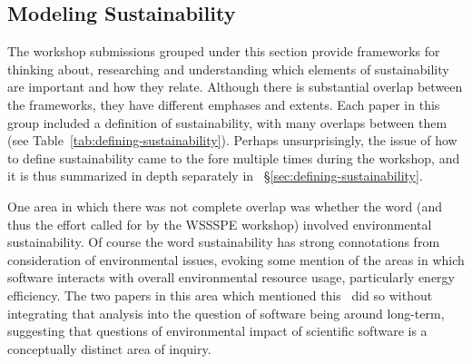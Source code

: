 \documentclass[11pt, oneside]{amsart}
\begin{document}
\subsection{Modeling Sustainability}

The workshop submissions grouped under this section provide frameworks
for thinking about, researching and understanding which elements of
sustainability are important and how they relate. Although there is
substantial overlap between the frameworks, they have different
emphases and extents.  Each paper in this group included a definition
of sustainability, with many overlaps between them (see
Table~\ref{tab:defining-sustainability}).  Perhaps unsurprisingly, the
issue of how to define sustainability came to the fore multiple times
during the workshop, and it is thus summarized in depth separately in
~\S\ref{sec:defining-sustainability}.

One area in which there was not complete overlap was whether the word
(and thus the effort called for by the WSSSPE workshop) involved
environmental sustainability. Of course the word sustainability has
strong connotations from consideration of environmental issues,
evoking some mention of the areas in which software interacts with
overall environmental resource usage, particularly energy efficiency.
The two papers in this area which mentioned
this~\cite{Venters_WSSSPE,Calero_WSSSPE} did so without integrating
that analysis into the question of software being around long-term,
suggesting that questions of environmental impact of scientific
software is a conceptually distinct area of inquiry.
\end{document}
